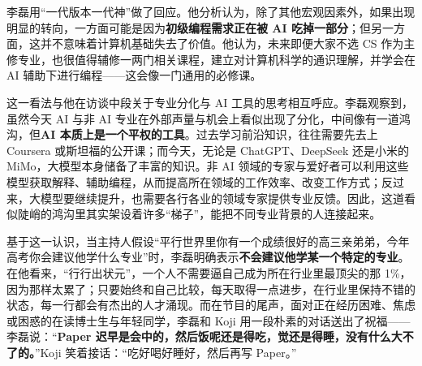 \documentclass[UTF8,a4paper,11pt,fontset=fandol]{ctexart}
\begin{document}
李磊用“一代版本一代神”做了回应。他分析认为，除了其他宏观因素外，如果出现明显的转向，一方面可能是因为\textbf{初级编程需求正在被 AI 吃掉一部分}；但另一方面，这并不意味着计算机基础失去了价值。他认为，未来即便大家不选 CS 作为主修专业，也很值得辅修一两门相关课程，建立对计算机科学的通识理解，并学会在 AI 辅助下进行编程——这会像一门通用的必修课。

这一看法与他在访谈中段关于专业分化与 AI 工具的思考相互呼应。李磊观察到，虽然今天 AI 与非 AI 专业在外部声量与机会上看似出现了分化，中间像有一道鸿沟，但\textbf{AI 本质上是一个平权的工具}。过去学习前沿知识，往往需要先去上 Coursera 或斯坦福的公开课；而今天，无论是 ChatGPT、DeepSeek 还是小米的 MiMo，大模型本身储备了丰富的知识。非 AI 领域的专家与爱好者可以利用这些模型获取解释、辅助编程，从而提高所在领域的工作效率、改变工作方式；反过来，大模型要继续提升，也需要各行各业的领域专家提供专业反馈。因此，这道看似陡峭的鸿沟里其实架设着许多“梯子”，能把不同专业背景的人连接起来。

基于这一认识，当主持人假设“平行世界里你有一个成绩很好的高三亲弟弟，今年高考你会建议他学什么专业”时，李磊明确表示\textbf{不会建议他学某一个特定的专业}。在他看来，“行行出状元”，一个人不需要逼自己成为所在行业里最顶尖的那 1\%，因为那样太累了；只要始终和自己比较，每天取得一点进步，在行业里保持不错的状态，每一行都会有杰出的人才涌现。而在节目的尾声，面对正在经历困难、焦虑或困惑的在读博士生与年轻同学，李磊和 Koji 用一段朴素的对话送出了祝福——李磊说：“\textbf{Paper 迟早是会中的，然后饭呢还是得吃，觉还是得睡，没有什么大不了的。}”Koji 笑着接话：“吃好喝好睡好，然后再写 Paper。”
\end{document}
